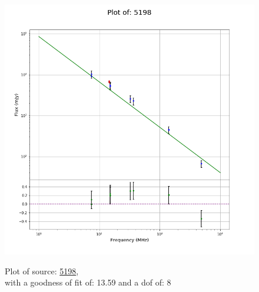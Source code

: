 \documentclass{article}
\begin{document}
\begin{figure}[H]
\begin{minipage}{0.5\textwidth}
        \includegraphics[scale = 0.35]{KmeulenSimSource_1hr/1hr5198.png}
        \captionsetup{labelformat=empty}
        \caption{Plot of source: \href{http://banana.transientskp.org/r4/vlo_KmeulenSimSource/runningcatalog/5198}{5198},\\with a goodness of fit of: 13.59 and a dof of: 8}
    \addtocounter{figure}{-1}
    \label{KmeulenSimSource:1hr:5198:plot}
    \end{minipage}
\end{figure}
\newpage
\end{document}
